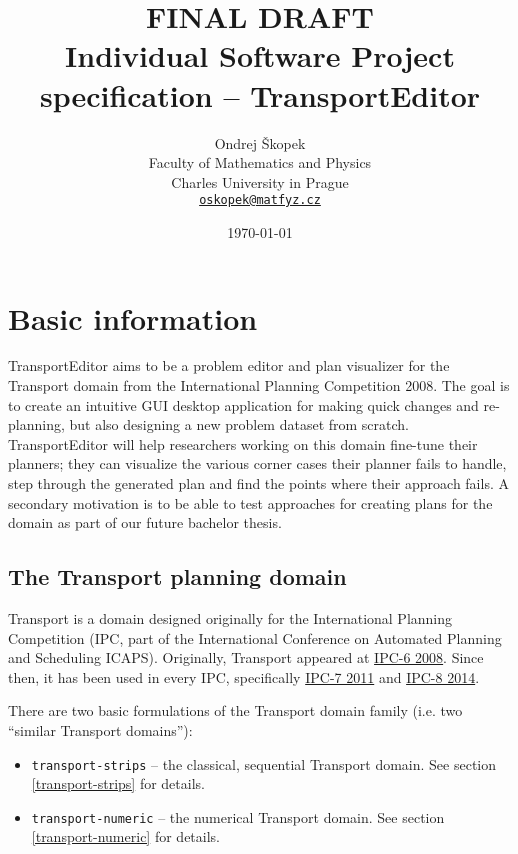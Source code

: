 \documentclass[10pt,a4paper,oneside]{article}
\author{Ondrej Škopek\\
Faculty of Mathematics and Physics\\
Charles University in Prague\\
\texttt{\href{mailto:oskopek@matfyz.cz}{oskopek@matfyz.cz}}}
\title{\textbf{FINAL DRAFT}\\Individual Software Project specification -- TransportEditor}
\date{\today}
\newcommand{\pname}{TransportEditor} %
\begin{document}
\maketitle











\section{Basic information}

\pname{} aims to be a problem editor and plan visualizer for the Transport domain from the International Planning Competition 2008.
The goal is to create an intuitive GUI desktop application for making quick changes and re-planning, but also designing a new problem dataset from scratch. \pname{} will help researchers working on this domain fine-tune their planners; they can visualize the various corner cases their planner fails to handle, step through the generated plan and find the points where their approach fails.
A secondary motivation is to be able to test approaches for creating plans for the domain as part of our future bachelor thesis.

\subsection{The Transport planning domain} \label{domain-info}

Transport is a domain designed originally for the International Planning Competition (IPC, part of the International Conference on Automated Planning and Scheduling ICAPS).
Originally, Transport appeared at \href{http://icaps-conference.org/ipc2008/deterministic/Domains.html}{IPC-6 2008}.
Since then, it has been used in every IPC, specifically \href{http://www.plg.inf.uc3m.es/ipc2011-deterministic/}{IPC-7 2011}
and \href{https://helios.hud.ac.uk/scommv/IPC-14/}{IPC-8 2014}.

There are two basic formulations of the Transport domain family (i.e. two ``similar Transport domains''):
\begin{itemize}
\item \verb+transport-strips+ -- the classical, sequential Transport domain. See section \ref{transport-strips} for details.
\item \verb+transport-numeric+ -- the numerical Transport domain. See section \ref{transport-numeric} for details.
\end{itemize}
\end{document}
